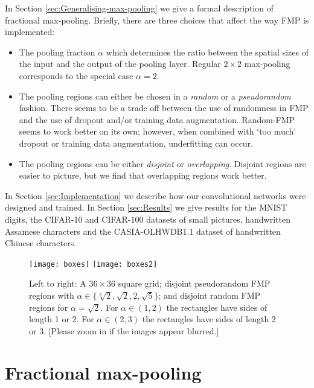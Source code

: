 \documentclass[english]{article}
\begin{document}
In Section \ref{sec:Generalising-max-pooling} we give a formal description
of fractional max-pooling. Briefly, there are three choices that affect
the way FMP is implemented:
\begin{itemize}
\item The pooling fraction $\alpha$ which determines the ratio between
the spatial sizes of the input and the output of the pooling layer.
Regular $2\times2$ max-pooling corresponds to the special case $\alpha=2$.
\item The pooling regions can either be chosen in a \emph{random} or a \emph{pseudorandom}
fashion. There seems to be a trade off between the use of randomness
in FMP and the use of dropout and/or training data augmentation.
Random-FMP seems to work better on its own; however, when combined with `too much' dropout or training data augmentation,
underfitting can occur.
\item The pooling regions can be either \emph{disjoint} or \emph{overlapping}.
Disjoint regions are easier to picture, but we find that overlapping
regions work better.
\end{itemize}
In Section \ref{sec:Implementation} we describe how our convolutional
networks were designed and trained. In Section \ref{sec:Results}
we give results for the MNIST digits, the CIFAR-10 and CIFAR-100 datasets
of small pictures, handwritten Assamese characters and the CASIA-OLHWDB1.1
dataset of handwritten Chinese characters.

\begin{figure}
\begin{centering}
\texttt{[image: boxes]}
\texttt{[image: boxes2]}
\par\end{centering}

\caption{Left to right: A $36\times36$ square grid; disjoint pseudorandom
FMP regions with \mbox{$\alpha\in\{\sqrt[3]{2},\sqrt{2},2,\sqrt{5}\}$};
and disjoint random FMP regions for $\alpha=\sqrt{2}$. For $\alpha\in(1,2)$
the rectangles have sides of length 1 or 2. For $\alpha\in(2,3)$
the rectangles have sides of length 2 or 3. [Please zoom in if the images appear blurred.]\label{fig:pool}}
\end{figure}



\section{Fractional max-pooling\label{sec:Generalising-max-pooling}}
\end{document}
